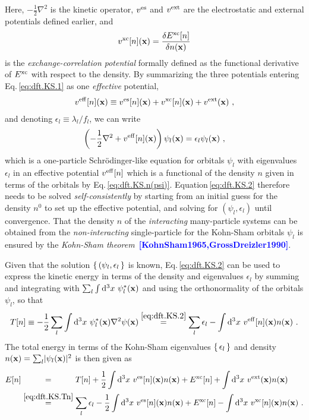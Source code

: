 \documentclass[a4paper,12pt]{book}
\renewcommand{\d}{{\rm d}}
\newcommand{\CITE}[1]{\textcolor{blue}{{\bf [#1]}}}
\begin{document}
Here, $-\frac{1}{2} \nabla^2$ is the kinetic operator, $v^{\rm es}$ and $v^{\rm ext}$ are the electrostatic and external potentials defined earlier, and
\begin{align}
	v^{\rm xc} [n] ({\bf x})
		= \frac{\delta E^{\rm xc}[n]}{\delta n ({\bf x})}
	\label{eq:dft.vxc}
\end{align}
is the \emph{exchange-correlation potential} formally defined as the functional derivative of $E^{\rm xc}$ with respect to the density. By summarizing the three potentials entering Eq.\,\eqref{eq:dft.KS.1} as one \emph{effective} potential,
\begin{align}
	v^{\rm eff} [n] ({\bf x})
	\equiv
		v^{\rm es} [n] ({\bf x})
		+ v^{\rm xc} [n] ({\bf x})
		+ v^{\rm ext}  ({\bf x})~,
	\label{eq:dft.KS.veff}
\end{align}
 and denoting $\epsilon_l \equiv \lambda_l / f_l$, we can write
\begin{align}
	\left(
		-\frac{1}{2} \nabla^2 
		+ v^{\rm eff} [n] ({\bf x})
	\right) \psi_l ({\bf x})
	= \epsilon_l \psi_l ({\bf x})~,
\label{eq:dft.KS.2}
\end{align}
which is a one-particle Schr\"odinger-like equation for orbitals $\psi_l$ with eigenvalues $\epsilon_l$ in an effective potential $v^{\rm eff}[n]$ which is a functional of the density $n$ given in terms of the orbitals by Eq.\,\eqref{eq:dft.KS.n(psi)}. Equation\,\eqref{eq:dft.KS.2} therefore needs to be solved \emph{self-consistently} by starting from an initial guess for the density $n^0$ to set up the effective potential, and solving for $(\psi_l, \epsilon_l)$ until convergence. That the density $n$ of the \emph{interacting} many-particle systems can be obtained from the \emph{non-interacting} single-particle for the Kohn-Sham orbitals $\psi_l$ is ensured by the \emph{Kohn-Sham theorem}~\CITE{KohnSham1965,GrossDreizler1990}.

Given that the solution $\set{(\psi_l, \epsilon_l}$ is known, Eq.\,\eqref{eq:dft.KS.2} can be used to express the kinetic energy in terms of the density and eigenvalues $\epsilon_l$ by summing and integrating with $\sum_l \int \d^3 x~\psi^\ast_l ({\bf x})$ and using the orthonormality of the orbitals $\psi_l$, so that
\begin{align}
	T[n] 
		\equiv - \frac{1}{2}\sum_l \int \d^3 x ~ \psi^\ast_l ({\bf x}) \nabla^2 \psi({\bf x})
		\stackrel{\eqref{eq:dft.KS.2}}{=} 
			\sum_l \epsilon_l 
			- \int \d^3 x ~ v^{\rm eff}[n] ({\bf x}) n({\bf x})~.
	\label{eq:dft.KS.Tn}
\end{align}
The total energy in terms of the Kohn-Sham eigenvalues $\set{\epsilon_l}$ and density $n ({\bf x}) = \sum_l \lvert \psi_l ({\bf x}) \rvert^2$ is then given as
\begin{align}
	E[n]
		&\stackrel{\phantom{\eqref{eq:dft.KS.Tn}}}{=} 
			T[n] 
			+ \frac{1}{2} \int \d^3 x ~ v^{\rm es} [n] ({\bf x}) n ({\bf x})
			+ E^{\rm xc}[n]
			+ \int \d^3 x ~ v^{\rm ext} ({\bf x}) n ({\bf x})
			\nonumber \\
		&\stackrel{\eqref{eq:dft.KS.Tn}}{=}
			\sum_l \epsilon_l 
			- \frac{1}{2} \int \d^3 x ~ v^{\rm es} [n] ({\bf x}) n ({\bf x})
			+ E^{\rm xc}[n]
			- \int \d^3 x ~ v^{\rm xc}[n] ({\bf x}) n ({\bf x})~.
	\label{eq:dft.KS.En}
\end{align}
\end{document}
